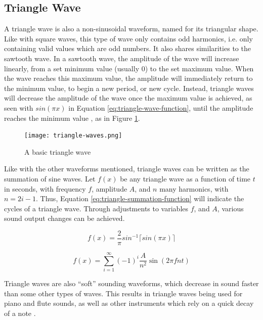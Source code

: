 \subsection{Triangle Wave}

A triangle wave is also a non-sinusoidal waveform, named for its triangular shape. Like with square waves, this type of wave only contains odd harmonics, i.e. only containing valid values which are odd numbers. It also shares similarities to the sawtooth wave. In a sawtooth wave, the amplitude of the wave will increase linearly, from a set minimum value (usually 0) to the set maximum value. When the wave reaches this maximum value, the amplitude will immediately return to the minimum value, to begin a new period, or new cycle. Instead, triangle waves will decrease the amplitude of the wave once the maximum value is achieved, as seen with $sin(\pi x)$ in Equation \ref{eq:triangle-wave-function}, until the amplitude reaches the minimum value \cite{Tarr_2019}, as in Figure \ref{fig:triangle-wave}.

\begin{figure}[ht]
  \centering
  \texttt{[image: triangle-waves.png]}
  \caption{A basic triangle wave}\cite{Wellesley_College_Staff_2021}
  \label{fig:triangle-wave}
\end{figure}


Like with the other waveforms mentioned, triangle waves can be written as the summation of sine waves. Let $f(x)$ be any triangle wave as a function of time $t$ in seconds, with frequency $f$, amplitude $A$, and $n$ many harmonics, with $n = 2i - 1$. Thus, Equation \ref{eq:triangle-summation-function} will indicate the cycles of a triangle wave. Through adjustments to variables $f$, and $A$, various sound output changes can be achieved. 

\begin{equation}
	f(x) = \frac{2}{\pi}sin^{-1}\lceil sin(\pi x) \rceil
	\label{eq:triangle-wave-function}	
\end{equation}

\begin{equation}
	f(x) = \sum_{i=1}^{\infty} (-1)^i \frac{A}{n^2} \sin(2\pi fnt)
	\label{eq:triangle-summation-function}
\end{equation}

Triangle waves are also ``soft'' sounding waveforms, which decrease in sound faster than some other types of waves. This results in triangle waves being used for piano and flute sounds, as well as other instruments which rely on a quick decay of a note \cite{Dowsett_2016}.

